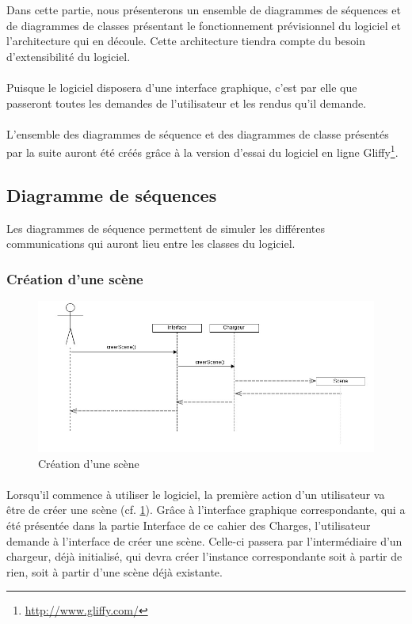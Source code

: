 Dans cette partie, nous présenterons un ensemble de diagrammes de séquences et de diagrammes de classes présentant le fonctionnement prévisionnel du logiciel et l’architecture qui en découle. Cette architecture tiendra compte du besoin d’extensibilité du logiciel.

\paragraph{}
Puisque le logiciel disposera d’une interface graphique, c’est par elle que passeront toutes les demandes de l’utilisateur et les rendus qu’il demande.

\paragraph{}
L’ensemble des diagrammes de séquence et des diagrammes de classe présentés par la suite auront été créés grâce à la version d’essai du logiciel en ligne Gliffy\footnote{\url{http://www.gliffy.com/}}.


\subsection{Diagramme de séquences}

Les diagrammes de séquence permettent de simuler les différentes communications qui auront lieu entre les classes du logiciel.

\subsubsection{Création d'une scène}

\begin{figure}[h]
		\centering
		\includegraphics[scale=0.4]{creerscene.jpg}
		\caption{\label{fig:creerScene} Création d'une scène}
\end{figure}

\paragraph{}
Lorsqu’il commence à utiliser le logiciel, la première action d’un utilisateur va être de créer une scène (cf. \ref{fig:creerScene}). Grâce à l’interface graphique correspondante, qui a été présentée dans la partie Interface de ce cahier des Charges, l’utilisateur demande à l’interface de créer une scène. Celle-ci passera par l’intermédiaire d’un chargeur, déjà initialisé, qui devra créer l’instance correspondante soit à partir de rien, soit à partir d’une scène déjà existante.

